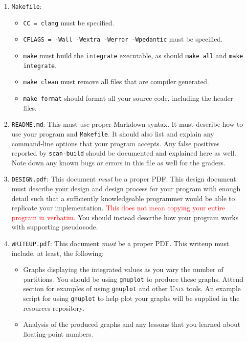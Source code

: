 \begin{enumerate}
  \item \texttt{Makefile}:
    \begin{itemize}
      \item \texttt{CC = clang} must be specified.
      \item \texttt{CFLAGS = -Wall -Wextra -Werror -Wpedantic} must be specified.
      \item \texttt{make} must build the \texttt{integrate}
        executable, as should \texttt{make all} and \texttt{make
        integrate}.
      \item \texttt{make clean} must remove all files that are compiler
        generated.
      \item \texttt{make format} should format all your source code,
        including the header files.
    \end{itemize}
  \item \texttt{README.md}: This must use proper Markdown syntax. It
    must describe how to use your program and \texttt{Makefile}. It
    should also list and explain any command-line options that your
    program accepts. Any false positives reported by \texttt{scan-build}
    should be documented and explained here as well. Note down any known
    bugs or errors in this file as well for the graders.
  \item \texttt{DESIGN.pdf}: This document \emph{must} be a proper
    PDF\@. This design document must describe your design and design
    process for your program with enough detail such that a sufficiently
    knowledgeable programmer would be able to replicate your
    implementation. \textcolor{red}{This does not mean copying your
    entire program in verbatim}. You should instead describe how your
    program works with supporting pseudocode.
  \item \texttt{WRITEUP.pdf}: This document \emph{must} be a proper
    PDF\@. This writeup must include, at least, the following:
      \begin{itemize}
        \item Graphs displaying the integrated values as you vary the
          number of partitions. You should be using \texttt{gnuplot} to
          produce these graphs. Attend section for examples of using
          \texttt{gnuplot} and other \textsc{Unix} tools. An example
          script for using \texttt{gnuplot} to help plot your graphs
          will be supplied in the resources repository.
        \item Analysis of the produced graphs and any lessons that you learned
          about floating-point numbers.
      \end{itemize}
\end{enumerate}
